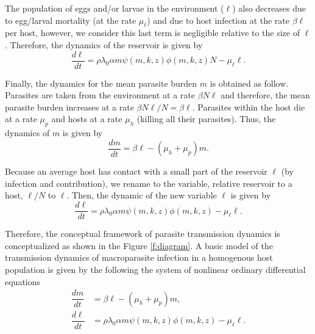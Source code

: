 \documentclass[eng]{MMSB-class-eng}
\begin{document}
{\color{red}
The population of eggs and/or larvae in the environment ($\ell$) also decreases due to egg/larval mortality (at the rate $\mu_{\ell}$) and due to host infection at the rate $\beta \ell$ per host, however, we consider this last term is negligible relative to the size of $\ell$. 
Therefore, the dynamics of the reservoir is given by
\begin{equation}\label{eqreservorioT}
\dfrac{d\ell}{dt}= \rho\lambda_0
\alpha m
\psi(m,k,z) \phi(m,k,z) N- \mu_{\ell} \ell.
\end{equation}

Finally, the dynamics for the mean parasite burden $m$ is obtained as follow. Parasites are taken from the environment at a rate $\beta N \ell $ and therefore, the mean parasite burden increases at a rate $\beta  N\ell/N=\beta\ell $. Parasites within the host die at a rate $\mu_p$ and hosts at a rate $\mu_h$ (killing all their parasites). Thus, the dynamics of $m$ is given by
\begin{equation}\label{eqm}
\dfrac{dm}{dt}=\beta \ell - (\mu_h+\mu_p)m.
\end{equation}



Because an average host has contact with a small part of the reservoir $\ell$ (by infection and contribution), we rename to the  variable, relative reservoir to a host, $\ell/N$ to $\ell$.
Then, the dynamic of the new variable $\ell$ is given by 	
\begin{equation}\label{eqreservorio}
\dfrac{d\ell}{dt}= \rho\lambda_0
\alpha m
\psi(m,k,z) \phi(m,k,z) - \mu_{\ell} \ell.
\end{equation}
	
Therefore, the conceptual framework of parasite transmission dynamics is conceptualized as shown in the Figure \ref{f:diagram}. A basic model of the transmission dynamics of macroparasite infection in a homogenous host population is given by the following the system of nonlinear ordinary differential equations
{\color{blue} 
\begin{equation}\label{model1}
\begin{split}
\dfrac{dm}{dt}&=\beta \ell - (\mu_h+\mu_p)m,\\
\dfrac{d\ell}{dt}&= \rho\lambda_0
\alpha m
\psi(m,k,z) \phi(m,k,z) - \mu_{\ell} \ell .
\end{split}
\end{equation}
}

}
\end{document}
